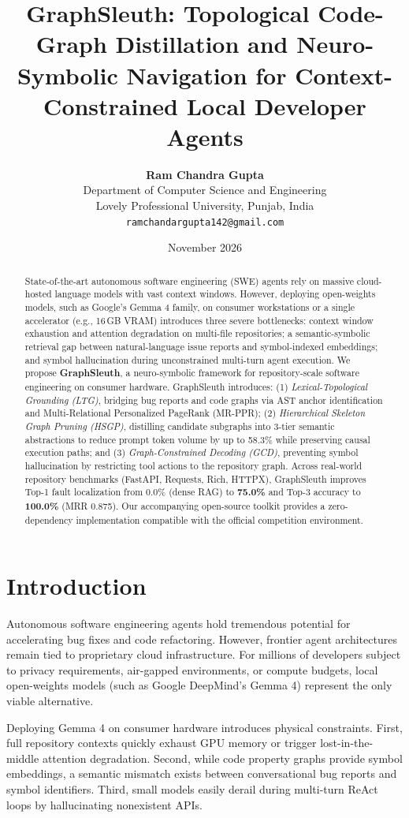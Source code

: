 \documentclass[11pt,a4paper]{article}
\title{\textbf{GraphSleuth: Topological Code-Graph Distillation and Neuro-Symbolic Navigation for Context-Constrained Local Developer Agents}}
\author{
  \textbf{Ram Chandra Gupta} \\
  Department of Computer Science and Engineering \\
  Lovely Professional University, Punjab, India \\
  \texttt{ramchandargupta142@gmail.com}
}
\date{November 2026}
\theoremstyle{plain}
\theoremstyle{definition}
\begin{document}
\maketitle

\begin{abstract}
State-of-the-art autonomous software engineering (SWE) agents rely on massive cloud-hosted language models with vast context windows. However, deploying open-weights models, such as Google's Gemma 4 family, on consumer workstations or a single accelerator (e.g., 16\,GB VRAM) introduces three severe bottlenecks: context window exhaustion and attention degradation on multi-file repositories; a semantic-symbolic retrieval gap between natural-language issue reports and symbol-indexed embeddings; and symbol hallucination during unconstrained multi-turn agent execution. We propose \textbf{GraphSleuth}, a neuro-symbolic framework for repository-scale software engineering on consumer hardware. GraphSleuth introduces: (1) \textit{Lexical-Topological Grounding (LTG)}, bridging bug reports and code graphs via AST anchor identification and Multi-Relational Personalized PageRank (MR-PPR); (2) \textit{Hierarchical Skeleton Graph Pruning (HSGP)}, distilling candidate subgraphs into 3-tier semantic abstractions to reduce prompt token volume by up to 58.3\% while preserving causal execution paths; and (3) \textit{Graph-Constrained Decoding (GCD)}, preventing symbol hallucination by restricting tool actions to the repository graph. Across real-world repository benchmarks (FastAPI, Requests, Rich, HTTPX), GraphSleuth improves Top-1 fault localization from 0.0\% (dense RAG) to \textbf{75.0\%} and Top-3 accuracy to \textbf{100.0\%} (MRR 0.875). Our accompanying open-source toolkit provides a zero-dependency implementation compatible with the official competition environment.
\end{abstract}

\section{Introduction}
Autonomous software engineering agents hold tremendous potential for accelerating bug fixes and code refactoring. However, frontier agent architectures remain tied to proprietary cloud infrastructure. For millions of developers subject to privacy requirements, air-gapped environments, or compute budgets, local open-weights models (such as Google DeepMind's Gemma 4) represent the only viable alternative.

Deploying Gemma 4 on consumer hardware introduces physical constraints. First, full repository contexts quickly exhaust GPU memory or trigger lost-in-the-middle attention degradation. Second, while code property graphs provide symbol embeddings, a semantic mismatch exists between conversational bug reports and symbol identifiers. Third, small models easily derail during multi-turn ReAct loops by hallucinating nonexistent APIs.
\end{document}
